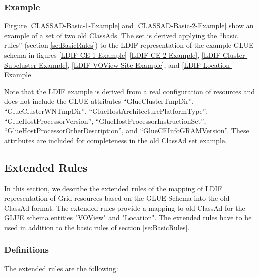 \documentclass[12pt]{article}
\begin{document}
\subsubsection{Example}
\label{se:BasicRulesExample}

Firgure \ref{CLASSAD-Basic-1-Example} and
\ref{CLASSAD-Basic-2-Example} show an example of a set of two old
ClassAds. The set is derived applying the ``basic rules'' (section
\ref{se:BasicRules}) to the LDIF representation of the example GLUE
schema in figures \ref{LDIF-CE-1-Example} \ref{LDIF-CE-2-Example},
\ref{LDIF-Cluster-Subcluster-Example},
\ref{LDIF-VOView-Site-Example}, and \ref{LDIF-Location-Example}.

Note that the LDIF example is derived from a real configuration of
resources and does not include the GLUE attributes
``GlueClusterTmpDir'', ``GlueClusterWNTmpDir'',
``GlueHostArchitecturePlatformType'', ``GlueHostProcessorVersion'',
``GlueHostProcessorInstructionSet'',
``GlueHostProcessorOtherDescription'', and
``GlueCEInfoGRAMVersion''. These attributes are included for
completeness in the old ClassAd set example.



\subsection{Extended Rules}
\label{se:ExtendedRules}

In this section, we describe the extended rules of the mapping of
LDIF representation of Grid resources based on the GLUE Schema into
the old ClassAd format. The extended rules provide a mapping to old
ClassAd for the GLUE schema entities "VOView" and "Location". The
extended rules have to be used in addition to the basic rules of
section \ref{se:BasicRules}.


\subsubsection{Definitions}

The extended rules are the following:
\end{document}
